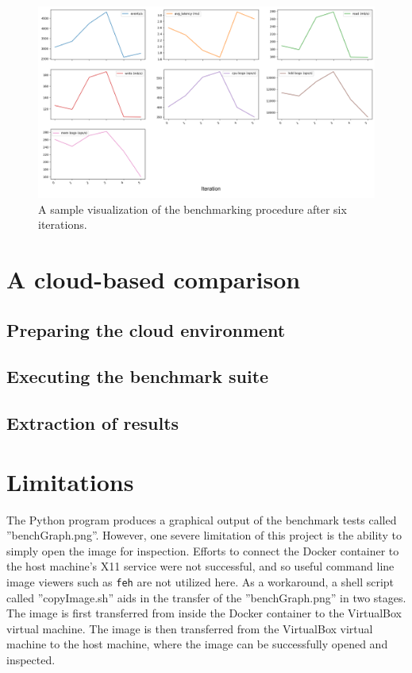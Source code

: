 \documentclass[sigconf]{acmart}
\begin{document}
\begin{figure}[!ht]
  \centering\includegraphics[width=\columnwidth]{images/samplePlot.png}
  \caption{A sample visualization of the benchmarking procedure after six iterations.}\label{f:samplePlot}
\end{figure}

\section{A cloud-based comparison}

\subsection{Preparing the cloud environment}

\subsection{Executing the benchmark suite}

\subsection{Extraction of results}

\section{Limitations}

The Python program produces a graphical output of the benchmark tests called ''benchGraph.png''. However, one severe limitation of this project is the ability to simply open the image for inspection. Efforts to connect the Docker container to the host machine's X11 service were not successful, and so useful command line image viewers such as {\tt feh} are not utilized here. As a workaround, a shell script called ''copyImage.sh'' aids in the transfer of the ''benchGraph.png'' in two stages. The image is first transferred from inside the Docker container to the VirtualBox virtual machine. The image is then transferred from the VirtualBox virtual machine to the host machine, where the image can be successfully opened and inspected. 
\end{document}

